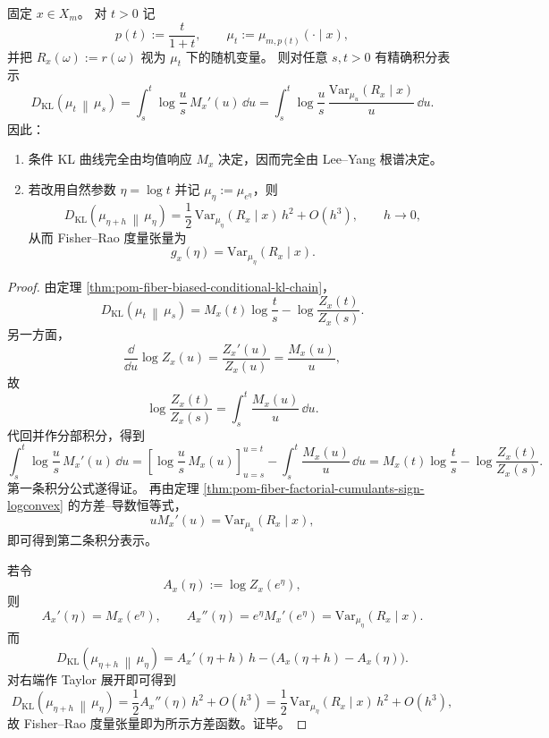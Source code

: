 \begin{theorem}\label{thm:pom-fiber-kl-variance-potential-fisher-rao}
固定 \(x\in X_m\)。
对 \(t>0\) 记
\[
p(t):=\frac{t}{1+t},
\qquad
\mu_t:=\mu_{m,p(t)}(\cdot\mid x),
\]
并把 \(R_x(\omega):=r(\omega)\) 视为 \(\mu_t\) 下的随机变量。
则对任意 \(s,t>0\) 有精确积分表示
\[
D_{\mathrm{KL}}\!\left(\mu_t\,\middle\|\,\mu_s\right)
=
\int_s^t\log\frac{u}{s}\,M_x'(u)\,\dd u
=
\int_s^t\log\frac{u}{s}\,\frac{\mathrm{Var}_{\mu_u}(R_x\mid x)}{u}\,\dd u.
\]
因此：
\begin{enumerate}
  \item 条件 KL 曲线完全由均值响应 \(M_x\) 决定，因而完全由 Lee--Yang 根谱决定。
  \item 若改用自然参数 \(\eta=\log t\) 并记 \(\mu_\eta:=\mu_{e^\eta}\)，则
  \[
  D_{\mathrm{KL}}\!\left(\mu_{\eta+h}\,\middle\|\,\mu_\eta\right)
  =
  \frac12\,\mathrm{Var}_{\mu_\eta}(R_x\mid x)\,h^2+O(h^3),
  \qquad h\to 0,
  \]
  从而 Fisher--Rao 度量张量为
  \[
  g_x(\eta)=\mathrm{Var}_{\mu_\eta}(R_x\mid x).
  \]
\end{enumerate}
\end{theorem}
\begin{proof}
由定理 \ref{thm:pom-fiber-biased-conditional-kl-chain}，
\[
D_{\mathrm{KL}}\!\left(\mu_t\,\middle\|\,\mu_s\right)
=
M_x(t)\log\frac{t}{s}-\log\frac{Z_x(t)}{Z_x(s)}.
\]
另一方面，
\[
\frac{\dd}{\dd u}\log Z_x(u)
=
\frac{Z_x'(u)}{Z_x(u)}
=
\frac{M_x(u)}{u},
\]
故
\[
\log\frac{Z_x(t)}{Z_x(s)}
=
\int_s^t\frac{M_x(u)}{u}\,\dd u.
\]
代回并作分部积分，得到
\[
\int_s^t\log\frac{u}{s}\,M_x'(u)\,\dd u
=
\left[\log\frac{u}{s}\,M_x(u)\right]_{u=s}^{u=t}
-\int_s^t\frac{M_x(u)}{u}\,\dd u
=
M_x(t)\log\frac{t}{s}-\log\frac{Z_x(t)}{Z_x(s)}.
\]
第一条积分公式遂得证。
再由定理 \ref{thm:pom-fiber-factorial-cumulants-sign-logconvex} 的方差--导数恒等式，
\[
uM_x'(u)=\mathrm{Var}_{\mu_u}(R_x\mid x),
\]
即可得到第二条积分表示。

若令
\[
A_x(\eta):=\log Z_x(e^\eta),
\]
则
\[
A_x'(\eta)=M_x(e^\eta),
\qquad
A_x''(\eta)=e^\eta M_x'(e^\eta)=\mathrm{Var}_{\mu_\eta}(R_x\mid x).
\]
而
\[
D_{\mathrm{KL}}\!\left(\mu_{\eta+h}\,\middle\|\,\mu_\eta\right)
=
A_x'(\eta+h)\,h-\bigl(A_x(\eta+h)-A_x(\eta)\bigr).
\]
对右端作 Taylor 展开即可得到
\[
D_{\mathrm{KL}}\!\left(\mu_{\eta+h}\,\middle\|\,\mu_\eta\right)
=
\frac12A_x''(\eta)\,h^2+O(h^3)
=
\frac12\,\mathrm{Var}_{\mu_\eta}(R_x\mid x)\,h^2+O(h^3),
\]
故 Fisher--Rao 度量张量即为所示方差函数。证毕。
\end{proof}

